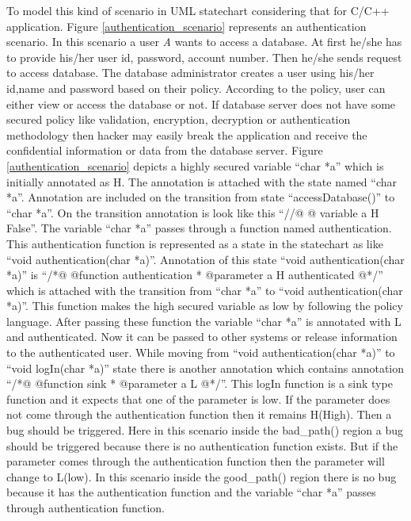 To model this kind of scenario in UML statechart considering that for C/C++ application. Figure \ref{authentication_scenario}  represents an authentication scenario. In this scenario a user \emph{A} wants to access a database. At first he/she has to provide his/her user id, password, account number. Then he/she sends request to access database. The database administrator creates a user using his/her id,name and password based on their policy. According to the policy, user can either view or access the database or not. If database server does not have some secured policy like validation, encryption, decryption or authentication methodology then hacker may easily break the application and receive the confidential information or data from the database server. Figure \ref{authentication_scenario} depicts a highly secured variable \enquote{char *a} which is initially annotated as H. The annotation is attached with the state named \enquote{char *a}. Annotation are included on the transition from state \enquote{accessDatabase()} to \enquote{char *a}. On the transition annotation is look like this \enquote{//@ @ variable a H False}. The variable \enquote{char *a} passes through a function named authentication. This authentication function is represented as a state in the statechart as like \enquote{void authentication(char *a)}. Annotation of this state \enquote{void authentication(char *a)} is \enquote{/*@ @function authentication
* @parameter a H authenticated @*/} which is attached with the transition from \enquote{char *a} to \enquote{void authentication(char *a)}. This function makes the high secured variable as low by following the policy language. After passing these function the variable \enquote{char *a} is annotated with L and authenticated. Now it can be passed to other systems or release information to the authenticated user. While moving from \enquote{void authentication(char *a)} to \enquote{void logIn(char *a)} state there is another annotation which contains annotation \enquote{/*@ @function sink * @parameter a L @*/}. This logIn function is a sink type function and it expects that one of the parameter is low. If the parameter does not come through the authentication function then it remains H(High). Then a bug should be triggered. Here in this scenario inside the bad\_path() region a bug should be triggered because there is no authentication function exists. But if the parameter comes through the authentication function then the parameter will change to L(low). In this scenario inside the good\_path() region there is no bug because it has the authentication function and the variable \enquote{char *a} passes through authentication function.

